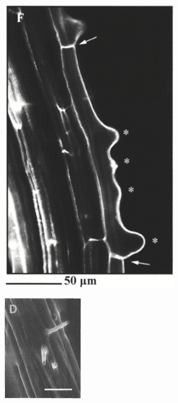\begin{figure}[t!]
\centering
\begin{subfigure}{3.3cm}
    \centering
    {\includegraphics[height=0.28\textheight]{fig01/Nswellings}
    \caption{}\label{sf:multiRH02a_alt}}
\end{subfigure}
\hspace{0.5cm}
\begin{subfigure}{3.3cm}
    \centering
    {\includegraphics[height=0.27\textheight]{fig01/Mswellings}
    \caption{}\label{sf:multiRH02b_alt}}

\end{subfigure}
\end{figure}
